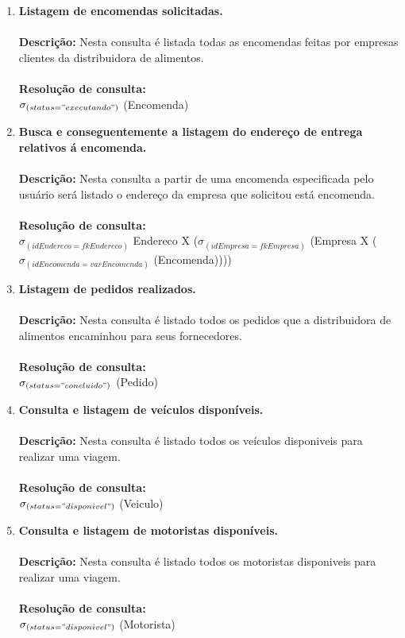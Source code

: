 \documentclass[12pt, onecolumn, titlepage]{article}
\begin{document}
\begin{enumerate}
\item \textbf{Listagem de encomendas solicitadas.} \\\\
\qquad \textbf{Descrição:} Nesta consulta é listada todas as encomendas feitas por empresas clientes da distribuidora de alimentos.\\\\
\qquad \textbf{Resolução de consulta:}\\
\qquad $\sigma _{(status="executando")}$ (Encomenda)\\

\item \textbf{Busca e conseguentemente a listagem do endereço de entrega relativos á encomenda.
} \\\\
\qquad \textbf{Descrição:} Nesta consulta a partir de uma encomenda especificada pelo usuário será listado o endereço da empresa que solicitou está encomenda.\\\\
\qquad \textbf{Resolução de consulta:}\\
\qquad $\sigma _{(idEndereco=fkEndereco)}$ Endereco X ($\sigma _{(idEmpresa=fkEmpresa)}$ (Empresa X ($\sigma _{(idEncomenda=varEncomenda)}$ (Encomenda)))) \\

\item \textbf{Listagem de pedidos realizados.} \\\\
\qquad \textbf{Descrição:} Nesta consulta é listado todos os pedidos que a distribuidora de alimentos encaminhou para seus fornecedores.\\\\
\qquad \textbf{Resolução de consulta:}\\
\qquad $\sigma _{(status="concluido")}$ (Pedido) \\

\item \textbf{Consulta e listagem de veículos disponíveis.} \\\\
\qquad \textbf{Descrição:} Nesta consulta é listado todos os veículos disponiveis para realizar uma viagem.\\\\
\qquad \textbf{Resolução de consulta:}\\
\qquad $\sigma _{(status="disponivel")}$ (Veiculo) \\

\item \textbf{Consulta e listagem de motoristas disponíveis.} \\\\
\qquad \textbf{Descrição:} Nesta consulta é listado todos os motoristas disponiveis para realizar uma viagem.\\\\
\qquad \textbf{Resolução de consulta:}\\
\qquad $\sigma _{(status="disponivel")}$ (Motorista) \\


\end{enumerate}
\end{document}
